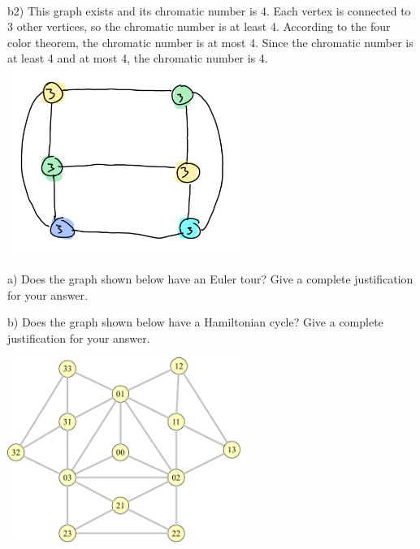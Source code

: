 \documentclass{article}
\begin{document}
\begin{solution}
	\\
	b2) This graph exists and its chromatic number is 4. Each vertex is connected to 3 other vertices, so the chromatic number is at least 4. According to the four color theorem, the chromatic number is at most 4. Since the chromatic number is at least 4 and at most 4, the chromatic number is 4.
	\\ \includegraphics[width=3in]{b2.png}

\end{solution}

\vspace{0.15in}
\newpage
\begin{problem}

a) Does the graph shown below have an Euler tour? Give a complete justification for your answer.

b) Does the graph shown below have a Hamiltonian cycle? Give a complete justification for your answer.


	\begin{center}
	\includegraphics[width = 3in]{Ham_graph.pdf}
	\end{center}

\end{problem}
\end{document}
